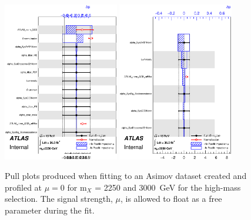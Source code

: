 \begin{figure}[hb]
\begin{center}
  \includegraphics[width=0.45\textwidth]{chapters/dihiggs2/figures/statFit/pullPlot_X2250_mu0_unconditional.eps} 
  \includegraphics[width=0.45\textwidth]{chapters/dihiggs2/figures/statFit/pullPlot_X3000_mu0_unconditional.eps}
   \caption{Pull plots produced when fitting to an Asimov dataset created and profiled at $\mu=0$ for m$_X$ = 2250 and 3000~GeV for the high-mass selection. The signal strength, $\mu$, is allowed to float as a free parameter during the fit.}
  \label{fig:pullPlots2_mu_uncond}
\end{center}    
\end{figure}



